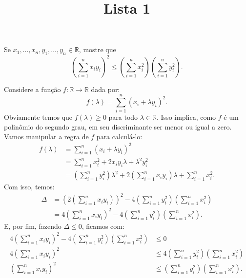 \documentclass[a4paper, 12pt]{article}
\title{Lista 1}
\begin{document}
\maketitle

\exercise 

\begin{parts}
\item Se $ x_{1}, \dots, x_{n}, y_{1}, \dots, y_{n} \in \mathbb{R}$, mostre que \[
        \left( \sum_{i = 1}^{n} x_i y_i \right)^2 \leq \left( \sum_{i = 1}^{n} x_i
        ^2 \right) \left( \sum_{i = 1}^{n} y_i ^2 \right) 
    .\]


    \begin{solution}
        Considere a função $ f : \mathbb{R} \to \mathbb{R} $ dada por: \[
            f(\lambda) = \sum_{i = 1}^{n} (x_i + \lambda y_i )^2
        .\]
        Obviamente temos que $ f(\lambda) \geq 0 $ para todo $ \lambda \in \mathbb{R} $.
        Isso implica, como $ f $ é um polinômio do segundo grau, em seu
        discriminante ser menor ou igual a zero. Vamos manipular a regra de
        $ f $ para calculá-lo:
        \begin{align*}
            f(\lambda) &= \sum_{i = 1}^{n} (x_i + \lambda y_i )^2 \\
                       &= \sum_{i = 1}^{n} x_i ^2 + 2 x_i y_i \lambda + \lambda^2
                       y_i ^2 \\
                       &= \left( \sum_{i = 1}^{n} y_i ^2 \right) \lambda^2 + 2
                       \left( \sum_{i = 1}^{n} x_i y_i \right) \lambda + \sum_{i =
                       1}^{n} x_i ^2.
        \end{align*}
        Com isso, temos:
        \begin{align*}
            \Delta &= \left( 2 \left( \sum_{i = 1}^{n} x_i y_i \right) \right) ^2  - 
            4 \left( \sum_{i = 1}^{n} y_i ^2 \right) \left( \sum_{i = 1}^{n} x_i ^2
            \right) \\
                   &= 4 \left( \sum_{i = 1}^{n} x_i y_i \right)^2 - 
                   4 \left( \sum_{i = 1}^{n} y_i ^2 \right) \left( \sum_{i = 1}^{n} x_i ^2
                   \right).
        \end{align*}
        E, por fim, fazendo $ \Delta \leq 0 $, ficamos com:
        \begin{align*}
            4 \left( \sum_{i = 1}^{n} x_i y_i \right)^2 - 
            4 \left( \sum_{i = 1}^{n} y_i ^2 \right) \left( \sum_{i = 1}^{n} x_i ^2
            \right) &\leq 0 \\
            4 \left( \sum_{i = 1}^{n} x_i y_i \right)^2 &\leq
            4 \left( \sum_{i = 1}^{n} y_i ^2 \right) \left( \sum_{i = 1}^{n} x_i ^2
            \right) \\
            \left( \sum_{i = 1}^{n} x_i y_i \right)^2 &\leq \left( \sum_{i = 1}^{n} y_i ^2
                \right) \left( \sum_{i = 1}^{n} x_i ^2
            \right). \\
            \end{align*}

        \end{solution} 

    \end{parts}

    
\end{document}

